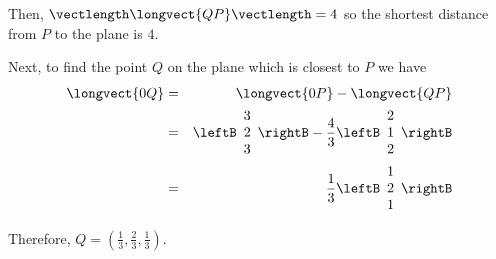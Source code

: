 \begin{solution}
Then, $\vectlength \longvect{QP} \vectlength = 4$ so the shortest distance from $P$ to the plane is $4$. 

Next, to find the point $Q$ on the plane which is closest to $P$ we have
\begin{eqnarray*}
\longvect{0Q} &=& \longvect{0P} - \longvect{QP} \\
&=& \leftB
\begin{array}{r}
3 \\
2 \\
3
\end{array}
\rightB 
-
\frac{4}{3} \leftB
\begin{array}{r}
2 \\
1 \\
2
\end{array}
\rightB \\
&=& 
\frac{1}{3}
\leftB
\begin{array}{r}
1 \\
2 \\
1
\end{array}
\rightB
\end{eqnarray*}

Therefore, $Q = (\frac{1}{3}, \frac{2}{3}, \frac{1}{3} )$.  
\end{solution}
